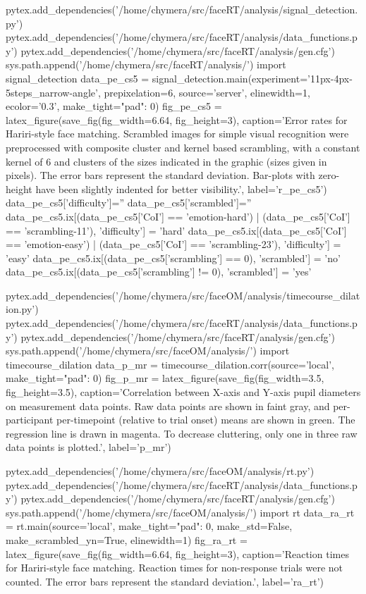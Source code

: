 \begin{pycode}[pe_cs5]
pytex.add_dependencies('/home/chymera/src/faceRT/analysis/signal_detection.py')
pytex.add_dependencies('/home/chymera/src/faceRT/analysis/data_functions.py')
pytex.add_dependencies('/home/chymera/src/faceRT/analysis/gen.cfg')
sys.path.append('/home/chymera/src/faceRT/analysis/')
import signal_detection
data_pe_cs5 = signal_detection.main(experiment='11px-4px-5steps_narrow-angle', prepixelation=6, source='server', elinewidth=1, ecolor='0.3', make_tight={"pad": 0})
fig_pe_cs5 = latex_figure(save_fig(fig_width=6.64, fig_height=3), caption='Error rates for Hariri-style face matching. Scrambled images for simple visual recognition were preprocessed with composite cluster and kernel based scrambling, with a constant kernel of \SI{6}{\pixel} and clusters of the sizes indicated in the graphic (sizes given in pixels). The error bars represent the standard deviation. Bar-plots with zero-height have been slightly indented for better visibility.', label='r_pe_cs5')
data_pe_cs5['difficulty']=''
data_pe_cs5['scrambled']=''
data_pe_cs5.ix[(data_pe_cs5['CoI'] == 'emotion-hard') | (data_pe_cs5['CoI'] == 'scrambling-11'), 'difficulty'] = 'hard'
data_pe_cs5.ix[(data_pe_cs5['CoI'] == 'emotion-easy') | (data_pe_cs5['CoI'] == 'scrambling-23'), 'difficulty'] = 'easy'
data_pe_cs5.ix[(data_pe_cs5['scrambling'] == 0), 'scrambled'] = 'no'
data_pe_cs5.ix[(data_pe_cs5['scrambling'] != 0), 'scrambled'] = 'yes'
\end{pycode}
\begin{pycode}[p_mr]
pytex.add_dependencies('/home/chymera/src/faceOM/analysis/timecourse_dilation.py')
pytex.add_dependencies('/home/chymera/src/faceRT/analysis/data_functions.py')
pytex.add_dependencies('/home/chymera/src/faceRT/analysis/gen.cfg')
sys.path.append('/home/chymera/src/faceOM/analysis/')
import timecourse_dilation
data_p_mr = timecourse_dilation.corr(source='local', make_tight={"pad": 0})
fig_p_mr = latex_figure(save_fig(fig_width=3.5, fig_height=3.5), caption='Correlation between X-axis and Y-axis pupil diameters on measurement data points. Raw data points are shown in faint gray, and per-participant per-timepoint (relative to trial onset) means are shown in green. The regression line is drawn in magenta. To decrease cluttering, only one in three raw data points is plotted.', label='p_mr')
\end{pycode}
\begin{pycode}[ra_rt]
pytex.add_dependencies('/home/chymera/src/faceOM/analysis/rt.py')
pytex.add_dependencies('/home/chymera/src/faceRT/analysis/data_functions.py')
pytex.add_dependencies('/home/chymera/src/faceRT/analysis/gen.cfg')
sys.path.append('/home/chymera/src/faceOM/analysis/')
import rt
data_ra_rt = rt.main(source='local', make_tight={"pad": 0}, make_std=False, make_scrambled_yn=True, elinewidth=1)
fig_ra_rt = latex_figure(save_fig(fig_width=6.64, fig_height=3), caption='Reaction times for Hariri-style face matching. Reaction times for non-response trials were not counted. The error bars represent the standard deviation.', label='ra_rt')
\end{pycode}
